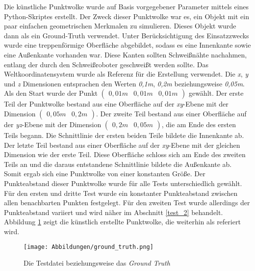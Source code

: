 Die künstliche Punktwolke wurde auf Basis vorgegebener Parameter mittels eines Python-Skriptes erstellt. Der Zweck dieser Punktwolke war es, ein Objekt mit ein paar einfachen geometrischen Merkmalen zu simulieren. Dieses Objekt wurde dann als ein Ground-Truth verwendet. Unter Berücksichtigung des Einsatzzwecks wurde eine treppenförmige Oberfläche abgebildet, sodass es eine Innenkante sowie eine Außenkante vorhanden war. Diese Kanten sollten Schweißnähte nachahmen, entlang der durch den Schweißroboter geschweißt werden sollte. Das Weltkoordinatensystem wurde als Referenz für die Erstellung verwendet. Die \textit{x}, \textit{y} und \textit{z} Dimensionen entsprachen den Werten \textit{0,1m}, \textit{0,2m} beziehungsweise \textit{0,05m}. Als den Start wurde der Punkt $\left(\begin{smallmatrix}
	0,01m & 0,01m & 0,01m
\end{smallmatrix}\right)$ gewählt. Der erste Teil der Punktwolke bestand aus eine Oberfläche auf der \textit{xy}-Ebene mit der Dimension $\left(\begin{smallmatrix}
0,05m & 0,2m
\end{smallmatrix}\right)$. Der zweite Teil bestand aus einer Oberfläche auf der \textit{yz}-Ebene mit der Dimension $\left(\begin{smallmatrix}
0,2m & 0,05m
\end{smallmatrix}\right)$, die am Ende des ersten Teils begann. Die Schnittlinie der ersten beiden Teile bildete die Innenkante ab. Der letzte Teil bestand aus einer Oberfläche auf der \textit{xy}-Ebene mit der gleichen Dimension wie der erste Teil. Diese Oberfläche schloss sich am Ende des zweiten Teils an und die daraus entstandene Schnittlinie bildete die Außenkante ab. Somit ergab sich eine Punktwolke von einer konstanten Größe. Der Punkteabstand dieser Punktwolke wurde für alle Tests unterschiedlich gewählt. Für den ersten und dritte Test wurde ein konstanter Punkteabstand zwischen allen benachbarten Punkten festgelegt. Für den zweiten Test wurde allerdings der Punkteabstand variiert und wird näher im Abschnitt \ref{test_2} behandelt. Abbildung \ref{fig: ground_truth} zeigt die künstlich erstellte Punktwolke, die weiterhin als \testcloud referiert wird. 

\begin{figure}[t]
	\texttt{[image: Abbildungen/ground\_truth.png]}
	\centering
	\caption[ground truth]{Die Testdatei beziehungsweise das \textit{Ground Truth}}
	\label{fig: ground_truth}
\end{figure}

